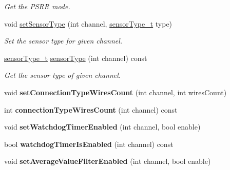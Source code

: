 \begin{DoxyCompactItemize}
\begin{DoxyCompactList}\small\item\em Get the PSRR mode. \end{DoxyCompactList}\item 
void \hyperlink{classmdt_device_modbus_wago_module_rtd_a91fc8fa26b323ac8a8d3f925df78dbc6}{setSensorType} (int channel, \hyperlink{classmdt_device_modbus_wago_module_rtd_a3ef847ef5be945559be1271e15905fb0}{sensorType\_\-t} type)
\begin{DoxyCompactList}\small\item\em Set the sensor type for given channel. \end{DoxyCompactList}\item 
\hyperlink{classmdt_device_modbus_wago_module_rtd_a3ef847ef5be945559be1271e15905fb0}{sensorType\_\-t} \hyperlink{classmdt_device_modbus_wago_module_rtd_aaee7df330e87d5facbbc6f73e3f356ce}{sensorType} (int channel) const 
\begin{DoxyCompactList}\small\item\em Get the sensor type of given channel. \end{DoxyCompactList}\item 
\hypertarget{classmdt_device_modbus_wago_module_rtd_a95c5db06b1245b8f3526fda60c307a89}{
void {\bfseries setConnectionTypeWiresCount} (int channel, int wiresCount)}
\label{classmdt_device_modbus_wago_module_rtd_a95c5db06b1245b8f3526fda60c307a89}

\item 
\hypertarget{classmdt_device_modbus_wago_module_rtd_af16255b0e876f971dfe3ea0139f040e1}{
int {\bfseries connectionTypeWiresCount} (int channel) const }
\label{classmdt_device_modbus_wago_module_rtd_af16255b0e876f971dfe3ea0139f040e1}

\item 
\hypertarget{classmdt_device_modbus_wago_module_rtd_a1b55d99a6ddf7ce95d18aeb081aafd73}{
void {\bfseries setWatchdogTimerEnabled} (int channel, bool enable)}
\label{classmdt_device_modbus_wago_module_rtd_a1b55d99a6ddf7ce95d18aeb081aafd73}

\item 
\hypertarget{classmdt_device_modbus_wago_module_rtd_a708c35425e024374e840c5ccc0b77d8b}{
bool {\bfseries watchdogTimerIsEnabled} (int channel) const }
\label{classmdt_device_modbus_wago_module_rtd_a708c35425e024374e840c5ccc0b77d8b}

\item 
\hypertarget{classmdt_device_modbus_wago_module_rtd_a49080955e90c46ab5d05b2a427d67721}{
void {\bfseries setAverageValueFilterEnabled} (int channel, bool enable)}
\label{classmdt_device_modbus_wago_module_rtd_a49080955e90c46ab5d05b2a427d67721}


\end{DoxyCompactItemize}
